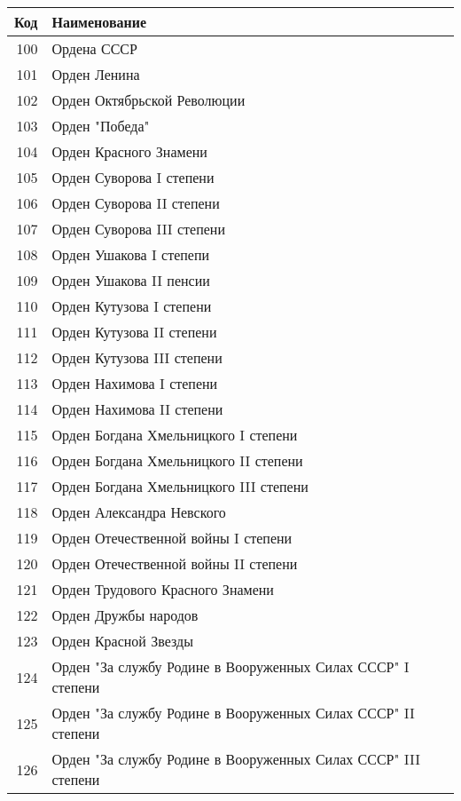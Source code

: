 \documentclass[10pt, a4paper, titlepage]{article}
\begin{document}
\begin{center}
    \begin{longtable}{rp{}}
        \hline
        \textbf{Код} & \textbf{Наименование} \\ \hline
        100 & Ордена СССР \\
        101 & Орден Ленина \\
        102 & Орден Октябрьской Революции \\
        103 & Орден "Победа" \\
        104 & Орден Красного Знамени \\
        105 & Орден Суворова I степени \\
        106 & Орден Суворова II степени \\
        107 & Орден Суворова III степени \\
        108 & Орден Ушакова I степепи \\
        109 & Орден Ушакова II пенсии \\
        110 & Орден Кутузова I степени \\
        111 & Орден Кутузова II степени \\
        112 & Орден Кутузова III степени \\
        113 & Орден Нахимова I степени \\
        114 & Орден Нахимова II степени \\
        115 & Орден Богдана Хмельницкого I степени \\
        116 & Орден Богдана Хмельницкого II степени \\
        117 & Орден Богдана Хмельницкого III степени \\
        118 & Орден Александра Невского \\
        119 & Орден Отечественной войны I степени \\
        120 & Орден Отечественной войны II степени \\
        121 & Орден Трудового Красного Знамени \\
        122 & Орден Дружбы народов \\
        123 & Орден Красной Звезды \\
        124 & Орден "За службу Родине в Вооруженных Силах СССР" I степени \\
        125 & Орден "За службу Родине в Вооруженных Силах СССР" II степени \\
        126 & Орден "За службу Родине в Вооруженных Силах СССР" III степени \\

\end{longtable}
\end{center}
\end{document}
